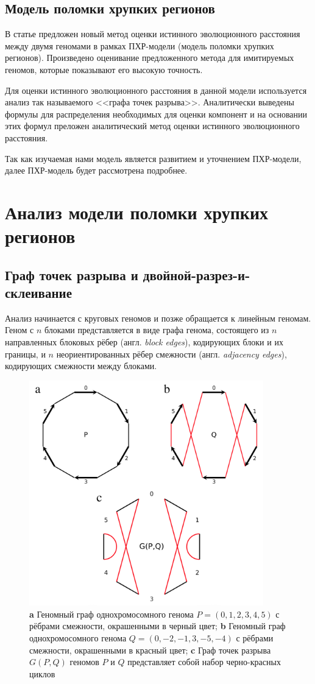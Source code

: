 \subsection{Модель поломки хрупких регионов}
В статье \cite{alexeev-1} предложен новый метод оценки истинного эволюционного расстояния между двумя геномами в рамках ПХР-модели (модель поломки хрупких регионов).
Произведено оценивание предложенного метода для имитируемых геномов, которые показывают его высокую точность.

Для оценки истинного эволюционного расстояния в данной модели используется анализ так называемого <<графа точек разрыва>>.
Аналитически выведены формулы для распределения необходимых для оценки компонент и на основании этих формул преложен аналитический метод оценки истинного эволюционного расстояния.

Так как изучаемая нами модель является развитием и уточнением ПХР-модели, далее ПХР-модель будет рассмотрена подробнее.

\section{Анализ модели поломки хрупких регионов}
\subsection{Граф точек разрыва и двойной-разрез-и-склеивание}
Анализ начинается с круговых геномов и позже обращается к линейным геномам.
Геном с $n$ блоками представляется в виде графа генома, состоящего из $n$ направленных блоковых рёбер (англ. \textit{block edges}), кодирующих блоки и их границы, и $n$ неориентированных рёбер смежности (англ. \textit{adjacency edges}), кодирующих смежности между блоками.

\begin{figure}[h!]
    \includegraphics[width=4in]{img/genome_graph.png}
    \caption{
        \textbf{a} Геномный граф однохромосомного генома $P = (0, 1, 2, 3, 4, 5)$ с рёбрами смежности, окрашенными в черный цвет;
        \textbf{b} Геномный граф однохромосомного генома $Q = (0, -2, -1, 3, -5, -4)$ с рёбрами смежности, окрашенными в красный цвет;
        \textbf{c} Граф точек разрыва $G (P, Q)$ геномов $P$ и $Q$ представляет собой набор черно-красных циклов
        }
    \label{al-fig-1}
\end{figure}


